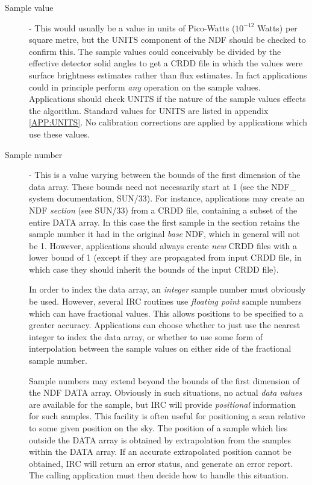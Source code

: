 \begin{description}

\item [Sample value] - This would usually be a value in units of Pico-Watts
($10^{-12}$ Watts) per square metre, but the UNITS component of the NDF should
be checked to confirm this. The sample values could conceivably be divided by
the effective detector solid angles to get a CRDD file in which the values were
surface brightness estimates rather than flux estimates. In fact applications
could in principle perform {\em any} operation on the sample values.
Applications should check UNITS if the nature of the sample values effects the
algorithm. Standard values for UNITS are listed in appendix \ref {APP:UNITS}. No
calibration corrections are applied by applications which use these values. 

\item [Sample number] - This is a value varying between the bounds of the
first dimension of the data array. These bounds need not necessarily start at 1
(see the NDF\_ system documentation, SUN/33). For instance, applications may
create an NDF {\em section} (see SUN/33) from a CRDD file, containing a subset
of the entire DATA array. In this case the first sample in the section retains
the sample number it had in the original {\em base} NDF, which in general will
not be 1. However, applications should always create {\em new} CRDD files 
with a lower bound of 1 (except if they are propagated from input CRDD file, in
which case they should inherit the bounds of the input CRDD file). 

In order to index the data array, an {\em integer} sample number must obviously
be used. However, several IRC routines use {\em floating point} sample numbers
which can have fractional values. This allows positions to be specified to a
greater accuracy. Applications can choose whether to just use the nearest
integer to index the data array, or whether to use some form of interpolation
between the sample values on either side of the fractional sample number. 

Sample numbers may extend beyond the bounds of the first dimension of the NDF
DATA array. Obviously in such situations, no actual {\em data values} are
available for the sample, but IRC will provide {\em positional} information for
such samples. This facility is often useful for positioning a scan relative to
some given position on the sky. The position of a sample which lies outside the
DATA array is obtained by extrapolation from the samples within the DATA array.
If an accurate extrapolated position cannot be obtained, IRC will return an
error status, and generate an error report. The calling application must then
decide how to handle this situation. 


\end{description}
